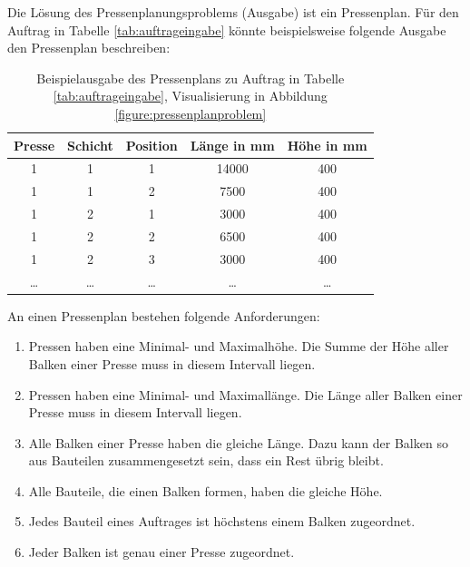 Die Lösung des Pressenplanungsproblems (Ausgabe) ist ein Pressenplan.
Für den Auftrag in Tabelle \ref{tab:auftrageingabe} könnte beispielsweise folgende Ausgabe den Pressenplan beschreiben:

\begin{table}[H]
    \centering
    \begin{tabular}{|c|c|c|c|c|}
        \hline
        \textbf{Presse} & \textbf{Schicht} & \textbf{Position} & \textbf{Länge in mm} & \textbf{Höhe in mm} \\
        \hline
        1 & 1 & 1 & 14000 & 400 \\
        1 & 1 & 2 & 7500 & 400 \\
        1 & 2 & 1 & 3000 & 400 \\
        1 & 2 & 2 & 6500 & 400 \\
        1 & 2 & 3 & 3000 & 400 \\
        \ldots & \ldots & \ldots & \ldots & \ldots \\
        \hline
    \end{tabular}
    \caption{Beispielausgabe des Pressenplans zu Auftrag in Tabelle \ref{tab:auftrageingabe}, Visualisierung in Abbildung \ref{figure:pressenplanproblem}}
    \label{tab:auftragausgabe}
\end{table}

An einen Pressenplan bestehen folgende Anforderungen:
\begin{enumerate}
    \item Pressen haben eine Minimal- und Maximalhöhe. Die Summe der Höhe aller Balken einer Presse muss in diesem Intervall liegen.
    \item Pressen haben eine Minimal- und Maximallänge. Die Länge aller Balken einer Presse muss in diesem Intervall liegen.
    \item Alle Balken einer Presse haben die gleiche Länge. Dazu kann der Balken so aus Bauteilen zusammengesetzt sein, dass ein Rest übrig bleibt.
    \item Alle Bauteile, die einen Balken formen, haben die gleiche Höhe.
    \item Jedes Bauteil eines Auftrages ist höchstens einem Balken zugeordnet.
    \item Jeder Balken ist genau einer Presse zugeordnet.
\end{enumerate}


